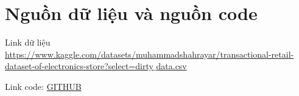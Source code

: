 \section{ Nguồn dữ liệu và nguồn code}
Link dữ liệu \href{https://www.kaggle.com/datasets/muhammadshahrayar/transactional-retail-dataset-of-electronics-store?select=dirty_data.csv}{https://www.kaggle.com/datasets/muhammadshahrayar/transactional-retail-dataset-of-electronics-store?select=dirty$\_$data.csv}

Link code: \href{https://github.com/Jacksurfer2005/XSTK}{GITHUB}
